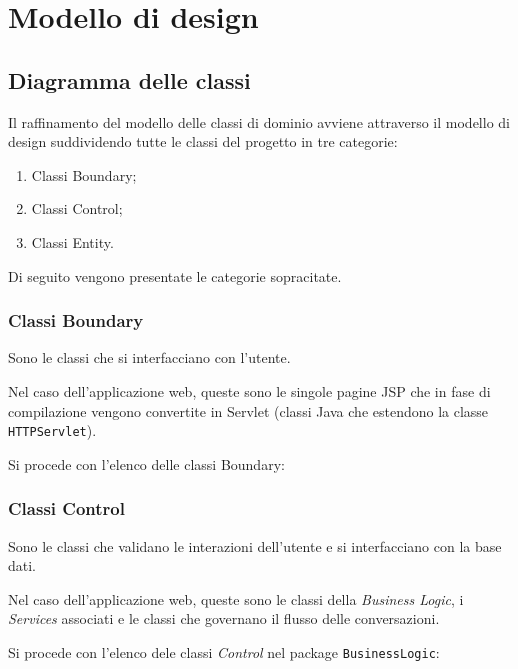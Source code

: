 
\chapter{Modello di design}
\label{cap:modello-di-design}

\section{Diagramma delle classi}
	Il raffinamento del modello delle classi di dominio avviene attraverso il modello di design suddividendo tutte le classi del progetto in tre categorie:
	\begin{enumerate}
		
		\item
		Classi Boundary;
		
		\item
		Classi Control;
		
		\item
		Classi Entity.
		
	\end{enumerate}
	Di seguito vengono presentate le categorie sopracitate.

	\subsection{Classi Boundary}
	Sono le classi che si interfacciano con l'utente.
	
	Nel caso dell'applicazione web, queste sono le singole pagine JSP che in fase di compilazione vengono convertite in Servlet (classi Java che estendono la classe \texttt{HTTPServlet}).
	
	Si procede con l'elenco delle classi Boundary:
	
	\subsection{Classi Control}
	Sono le classi che validano le interazioni dell'utente e si interfacciano con la base dati.
	
	Nel caso dell'applicazione web, queste sono le classi della \emph{Business Logic}, i \emph{Services} associati e le classi che governano il flusso delle conversazioni.
	
	Si procede con l'elenco dele classi \emph{Control} nel package \texttt{BusinessLogic}:
	
